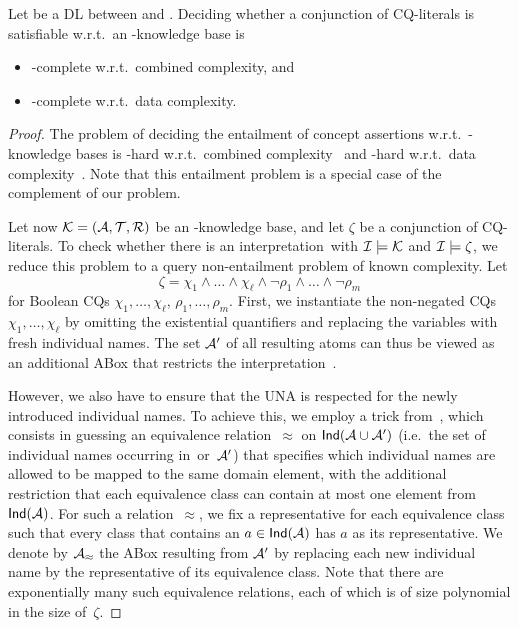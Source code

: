 \begin{theorem}\label{thm:complexity-conjunction-cq-literals}
    Let \Lmc be a DL between \ALC and \SHQ.  Deciding whether a conjunction of
    CQ-literals is satisfiable w.r.t.\ an \Lmc-knowledge base is
    \begin{itemize}
        \item \ExpTime-complete w.r.t.\ combined complexity, and
        \item \NP-complete w.r.t.\ data complexity.
    \end{itemize}
\end{theorem}

\begin{proof}
    The problem of deciding the entailment of concept assertions w.r.t.\
    \ALC-knowledge bases is \ExpTime-hard w.r.t.\ combined
    complexity~\cite{DLhandbook-07} and \coNP-hard w.r.t.\ data
    complexity~\cite{CDL+-KR06,Sch-JIIS93,DLN+-JLC94}.  Note that this
    entailment problem is a special case of the complement of our problem.

    Let now $\mathcal{K}=(\mathcal{A},\mathcal{T},\mathcal{R})$ be an \SHQ-knowledge base, and
    let $\zeta$ be a conjunction of CQ-literals.
    To check whether there is an interpretation~\Imc with $\mathcal{I}\models\mathcal{K}$ and
    $\mathcal{I}\models\zeta$, we reduce this problem to a query non-entailment problem
    of known complexity.  Let
    \[\zeta=\chi_1\land\dots\land\chi_\ell\land\lnot\rho_1\land\dots\land\lnot\rho_m\]
    for Boolean CQs $\chi_1,\dots,\chi_\ell$, $\rho_1,\dots,\rho_m$.  First, we
    instantiate the non-negated CQs $\chi_1,\dots,\chi_\ell$ by omitting the
    existential quantifiers and replacing the variables with fresh individual
    names.  The set $\mathcal{A}'$ of all resulting atoms can thus be viewed as an
    additional ABox that restricts the interpretation~\Imc.

    However, we also have to ensure that the UNA is respected for the newly
    introduced individual names.  To achieve this, we employ a trick
    from~\cite{GHL+-JAIR08}, which consists in guessing an equivalence
    relation~$\approx$ on $\mathsf{Ind}(\mathcal{A}\cup\mathcal{A}')$ (i.e.~the set of individual
    names occurring in~\Amc or~$\mathcal{A}'$) that specifies which individual names
    are allowed to be mapped to the same domain element, with the additional
    restriction that each equivalence class can contain at most one element from
    $\mathsf{Ind}(\mathcal{A})$.  For such a relation~$\approx$, we fix a representative for
    each equivalence class such that every class that contains an
    $a\in\mathsf{Ind}(\mathcal{A})$ has $a$ as its representative.
    We denote by $\mathcal{A}_\approx$ the ABox resulting from $\mathcal{A}'$ by replacing
    each new individual name by the representative of its equivalence class.
    Note that there are exponentially many such equivalence relations, each of
    which is of size polynomial in the size of~$\zeta$.


\end{proof}
